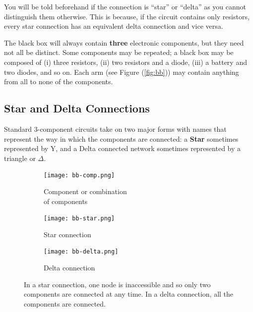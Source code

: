 \begin{imp}
You will be told beforehand if the connection is ``star'' or ``delta'' as you cannot distinguish them otherwise. This is because, if the circuit contains only resistors, every star connection has an equivalent delta connection and vice versa.

The black box will always contain \textbf{three} electronic components, but they need not all be distinct. Some components may be repeated; a black box may be composed of (i) three resistors, (ii) two resistors and a diode, (iii) a battery and two diodes, and so on. Each arm (see Figure (\ref{fig:bb})) may contain anything from all to none of the components.
\end{imp}


\subsection*{Star and Delta Connections}

Standard 3-component circuits take on two major forms with names that represent the way in which the components are connected: a \textbf{Star} sometimes represented by Y, and a Delta connected network sometimes represented by a triangle or $\Delta$.

\begin{figure}[!htb]
       \begin{subfigure}[t]{0.3\textwidth}
				\centering
                \texttt{[image: bb-comp.png]}
                \captionsetup{justification=centering}
                \caption{Component or combination \\of components}
       \end{subfigure}%
       \begin{subfigure}[t]{0.3\textwidth}
				\centering
                \texttt{[image: bb-star.png]}
                \caption{Star connection}
        \end{subfigure}%
        \begin{subfigure}[t]{0.3\textwidth}
        		\centering
                \texttt{[image: bb-delta.png]}
                \caption{Delta connection}
        \end{subfigure}%
        \caption{In a star connection, one node is inaccessible and so only two components are connected at any time. In a delta connection, all the components are connected.}
        \label{fig:starAndDelta}
\end{figure}

